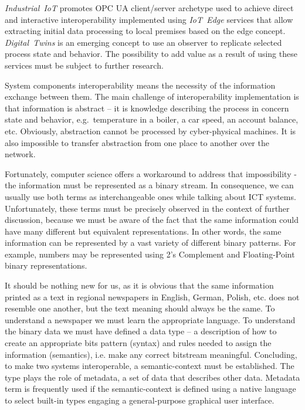 \documentclass[runningheads]{llncs}
\begin{document}
\emph{Industrial\ IoT} promotes OPC UA client/server archetype used to achieve direct and interactive interoperability implemented using \emph{IoT\ Edge} services that allow extracting initial data processing to local premises based on the edge concept. \emph{Digital\ Twins} is an emerging concept to use an observer to replicate selected process state and behavior. The possibility to add value as a result of using these services must be subject to further research.

System components interoperability means the necessity of the information exchange between them. The main challenge of interoperability implementation is that information is abstract -- it is knowledge describing the process in concern state and behavior, e.g.~temperature in a boiler, a car speed, an account balance, etc. Obviously, abstraction cannot be processed by cyber-physical machines. It is also impossible to transfer abstraction from one place to another over the network.

Fortunately, computer science offers a workaround to address that impossibility - the information must be represented as a binary stream. In consequence, we can usually use both terms as interchangeable ones while talking about ICT systems. Unfortunately, these terms must be precisely observed in the context of further discussion, because we must be aware of the fact that the same information could have many different but equivalent representations. In other words, the same information can be represented by a vast variety of different binary patterns. For example, numbers may be represented using 2's Complement and Floating-Point binary representations.

It should be nothing new for us, as it is obvious that the same information printed as a text in regional newspapers in English, German, Polish, etc. does not resemble one another, but the text meaning should always be the same. To understand a newspaper we must learn the appropriate language. To understand the binary data we must have defined a data type -- a description of how to create an appropriate bits pattern (syntax) and rules needed to assign the information (semantics), i.e. make any correct bitstream meaningful. Concluding, to make two systems interoperable, a semantic-context must be established. The type plays the role of metadata, a set of data that describes other data. Metadata term is frequently used if the semantic-context is defined using a native language to select built-in types engaging a general-purpose graphical user interface.
\end{document}
